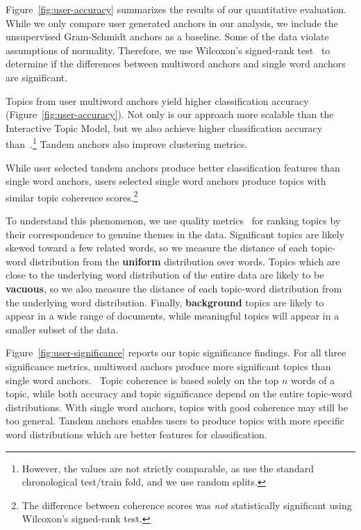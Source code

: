 Figure~\ref{fig:user-accuracy} summarizes
the results of our quantitative evaluation.
While we only compare user generated anchors in our
analysis, we include the unsupervised Gram-Schmidt anchors as a baseline.
Some of the data violate assumptions of normality.
Therefore, we use Wilcoxon's signed-rank test~\cite{wilcoxon-test} to determine
if the differences between multiword anchors and single word anchors are
significant.

Topics from user multiword anchors yield higher
classification accuracy (Figure~\ref{fig:user-accuracy}).
Not only is our approach more scalable than the Interactive Topic Model, but we
also achieve higher classification accuracy than~.\footnote{However, the values are not strictly comparable, as  use
the standard chronological test/train fold, and we use random splits.}
Tandem anchors also improve clustering
metrics.\statsiguser{}

While user selected tandem anchors produce better classification features than
single word anchors,
users selected single word anchors produce topics with similar topic
coherence scores.\footnote{The difference between coherence
scores was \emph{not} statistically significant using Wilcoxon's signed-rank
test.}


To understand this phenomenon, we use quality metrics~\cite{junk-topic} for
ranking topics by their correspondence to genuine themes in the data.
Significant topics are likely skewed toward a few related words, so
we measure the distance of each topic-word distribution from the {\bf uniform}
distribution over words.
Topics which are close to the underlying word distribution of the entire data
are likely to be {\bf vacuous}, so we also measure the distance of each topic-word
distribution from the underlying word distribution.
Finally, {\bf background} topics are likely to appear in a wide range of documents,
while meaningful topics will appear in a smaller subset of the data.

Figure~\ref{fig:user-significance} reports our topic significance findings.
For all three significance metrics, multiword anchors produce more significant
topics than single word anchors.\statsiguser{}
~Topic coherence is based solely on the top $n$ words of a topic, while both
accuracy and topic significance depend on the entire topic-word distributions.
With single word anchors, topics with good coherence may still be too general.
Tandem anchors enables users to produce topics with more specific word distributions which
are better features for classification.

